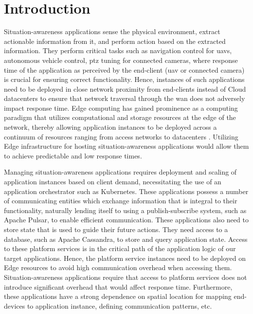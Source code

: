 \chapter{Introduction}
\label{sec:intro}

Situation-awareness applications sense the physical environment, extract actionable information from it, and perform action based on the extracted information. They perform critical tasks such as navigation control for \glspl{uav}, autonomous vehicle control, \gls{ptz} tuning for connected cameras, where response time of the application as perceived by the end-client (\gls{uav} or connected camera) is crucial for ensuring correct functionality. Hence, instances of such applications need to be deployed in close network proximity from end-clients instead of Cloud datacenters to ensure that network traversal through the \gls{wan} does not adversely impact response time. Edge computing has gained prominence as a computing paradigm that utilizes computational and storage resources at the edge of the network, thereby allowing application instances to be deployed across a continuum of resources ranging from access networks to datacenters \cite{ramachandran2021case}. Utilizing Edge infrastructure for hosting situation-awareness applications would allow them to achieve predictable and low response times.
\par Managing situation-awareness applications requires deployment and scaling of application instances based on client demand, necessitating the use of an application orchestrator such as Kubernetes. These applications possess a number of communicating entities which exchange information that is integral to their functionality, naturally lending itself to using a publish-subscribe system, such as Apache Pulsar, to enable efficient communication. These applications also need to store state that is used to guide their future actions. They need access to a database, such as Apache Cassandra, to store and query application state. Access to these platform services is in the critical path of the application logic of our target applications. Hence, the platform service instances need to be deployed on Edge resources to avoid high communication overhead when accessing them. Situation-awareness applications require that access to platform services does not introduce significant overhead that would affect response time. Furthermore, these applications  have a strong dependence on spatial location for mapping end-devices to application instance, defining communication patterns, etc. 

